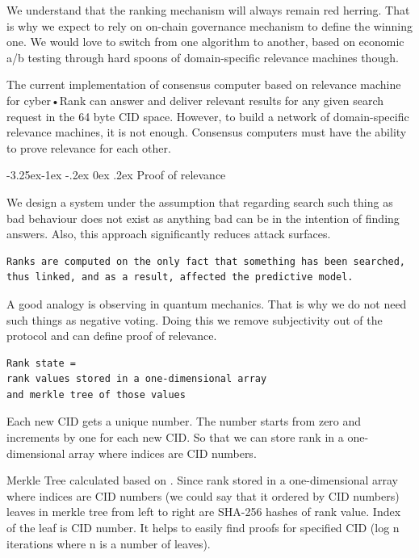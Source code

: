 \documentclass[8pt,oneside]{amsart}
\makeatletter
\newcommand{\linkgreen}[2]{\href{#1}{\color{green}{#2}}}
\renewcommand\subsection{\@startsection{subsection}{2}{\z@}%
                                     {-3.25ex\@plus -1ex \@minus -.2ex}%
                                     {0ex \@plus .2ex}%
                                     {\play\Large}}%
\newcommand{\titleSection}[1]{\subsection{#1}}
\newcommand{\code}[1]{{\PlayBold #1}}
\makeatother
\begin{document}
We understand that the ranking mechanism will always remain red herring. That is why we expect to rely on on-chain governance mechanism to define the winning one. We would love to switch from one algorithm to another, based on economic a/b testing through hard spoons of domain-specific relevance machines though.

The current implementation of consensus computer based on relevance machine for cyber•Rank can answer and deliver relevant results for any given search request in the 64 byte CID space. However, to build a network of domain-specific relevance machines, it is not enough. Consensus computers must have the ability to prove relevance for each other.

\titleSection{Proof of relevance}\label{Proof of relevance}

We design a system under the assumption that regarding search such thing as bad behaviour does not exist as anything bad can be in the intention of finding answers. Also, this approach significantly reduces attack surfaces.

\begin{lstlisting}
Ranks are computed on the only fact that something has been searched,
thus linked, and as a result, affected the predictive model.
\end{lstlisting}

A good analogy is observing in quantum mechanics. That is why we do not need such things as negative voting. Doing this we remove subjectivity out of the protocol and can define proof of relevance.

\begin{lstlisting}
Rank state =
rank values stored in a one-dimensional array
and merkle tree of those values
\end{lstlisting}

Each new CID gets a unique number. The number starts from zero and increments by one for each new CID. So that we can store rank in a one-dimensional array where indices are CID numbers.

Merkle Tree calculated based on \linkgreen{https://tools.ietf.org/html/rfc6962#section-2.1}{RFC-6962 standard}. Since rank stored in a one-dimensional array where indices are CID numbers (we could say that it ordered by CID numbers) leaves in merkle tree from left to right are \code{SHA-256} hashes of rank value. Index of the leaf is CID number. It helps to easily find proofs for specified CID (\code{log n} iterations where \code{n} is a number of leaves).
\end{document}
